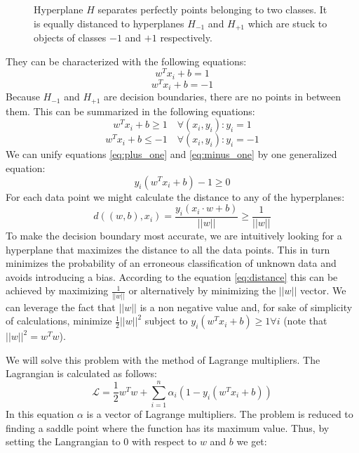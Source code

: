 \begin{figure}[htbp]
  \centering
  
  \caption{Hyperplane $H$ separates perfectly points belonging to two classes. It is equally distanced to hyperplanes $H_{-1}$ and $H_{+1}$ which are stuck to objects of classes $-1$ and $+1$ respectively.}
  \label{fig:two_hyperplanes}
\end{figure}


They can be characterized with the following equations:
\begin{equation}
w^T x_i+b = 1
\end{equation}
\begin{equation}
w^T x_i+b = -1
\end{equation}
Because $H_{-1}$ and $H_{+1}$ are decision boundaries, there are no points in between them. This can be summarized in the following equations:
\begin{equation} \label{eq:plus_one}
w^T x_i+b \ge 1 \quad \forall \left(x_i, y_i\right) : y_i=1
\end{equation}
\begin{equation} \label{eq:minus_one}
w^T x_i+b \le -1 \quad \forall \left(x_i, y_i\right) : y_i=-1
\end{equation}
We can unify equations \ref{eq:plus_one} and \ref{eq:minus_one} by one generalized equation:
\begin{equation}
y_i\left(w^T x_i+b\right)-1 \ge 0
\end{equation}
For each data point we might calculate the distance to any of the hyperplanes:
\begin{equation} \label{eq:distance}
d\left(\left(w,b\right), x_i\right) = \frac{y_i\left(x_i\cdot w + b\right)}{||w||} \ge \frac{1}{||w||}
\end{equation}
To make the decision boundary most accurate, we are intuitively looking for a hyperplane that maximizes the distance to all the data points. This in turn minimizes the probability of an erroneous classification of unknown data and avoids introducing a bias. According to the equation \ref{eq:distance} this can be achieved by maximizing $\frac{1}{||w||}$ or alternatively by minimizing the $||w||$ vector. We can leverage the fact that $||w||$ is a non negative value and, for sake of simplicity of calculations, minimize $\frac{1}{2}||w||^2$ subject to $y_i\left(w^T x_i+b\right) \ge 1 \forall i$ (note that $||w||^2=w^Tw$).

We will solve this problem with the method of Lagrange multipliers. The Lagrangian is calculated as follows:
\begin{equation}
\mathcal{L} = \frac{1}{2}w^Tw + \sum_{i=1}^{n}\alpha_i\left(1-y_i\left(w^Tx_i+b\right)\right)
\end{equation}
In this equation $\alpha$ is a vector of Lagrange multipliers. The problem is reduced to finding a saddle point where the function has its maximum value. Thus, by setting the Langrangian to 0 with respect to $w$ and $b$ we get:


